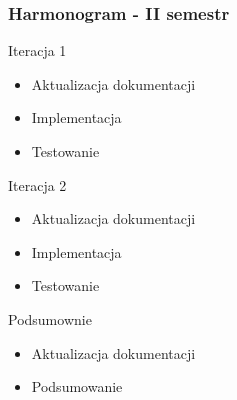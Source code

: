 \documentclass[xcolor=dvipsnames,9pt]{beamer}
\begin{document}
\begin{frame}
	\frametitle{Harmonogram - II semestr}
	\begin{block}{Iteracja 1}
	\begin{itemize}
 		\item Aktualizacja dokumentacji
		\item Implementacja
		\item Testowanie 
	\end{itemize}
	\end{block}
	\begin{block}{Iteracja 2}
	\begin{itemize}
 		\item Aktualizacja dokumentacji
		\item Implementacja
		\item Testowanie 
	\end{itemize}
	\end{block}
	\begin{block}{Podsumownie}
	\begin{itemize}
 		\item Aktualizacja dokumentacji
		\item Podsumowanie 
	\end{itemize}
	\end{block}
\end{frame}
\end{document}
